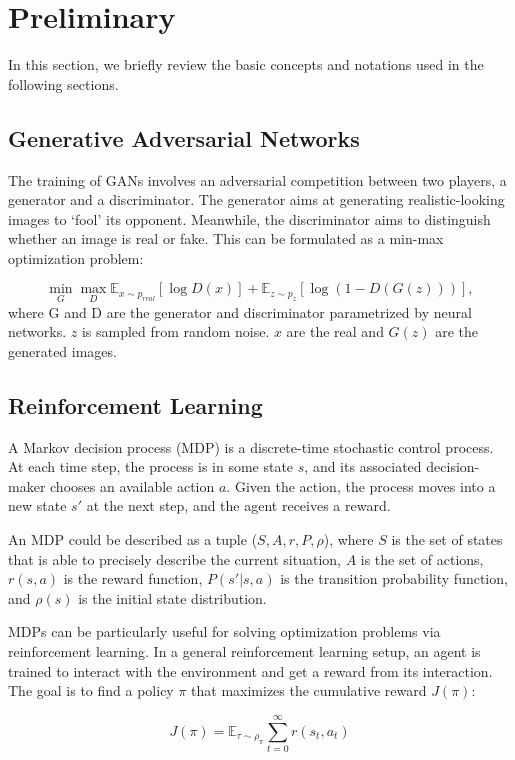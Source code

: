 \documentclass[runningheads]{llncs}
\begin{document}
\section{Preliminary}
In this section, we briefly review the basic concepts and notations used in the following sections.


\subsection{Generative Adversarial Networks}
The training of GANs involves an adversarial competition between two players, a generator and a discriminator. The generator aims at generating realistic-looking images to `fool' its opponent. Meanwhile, the discriminator aims to distinguish whether an image is real or fake. This can be formulated as a min-max optimization problem:

\begin{equation}
\min_G\max_D \mathbb{E}_{x\sim p_{real}}[\log{D(x)}]  + \mathbb{E}_{z\sim p_{z}} [\log{(1-D(G(z)))}],
\end{equation}
where G and D are the generator and discriminator parametrized by neural networks. $z$ is sampled from random noise. $x$ are the real and $G(z)$  are the generated images. 

\subsection{Reinforcement Learning}
A Markov decision process (MDP) is a discrete-time stochastic control process. At each time step, the process is in some state $s$, and its associated decision-maker chooses an available action $a$. Given the action, the process moves into a new state $s'$ at the next step, and the agent receives a reward. 

An MDP could be described as a tuple 
($S,A,r,P,\rho$), where $S$ is the set of states that is able to precisely describe the current situation,
$A$ is the set of actions, $r (s,a)$ is the reward function, 
$P (s'|s,a)$ is the 
transition probability function, and 
$\rho (s)$ is the initial state 
distribution.

MDPs can be particularly useful for solving optimization problems via reinforcement learning. In a general reinforcement learning setup, an agent is trained to interact with the environment and get a reward from its interaction. The goal is to find a policy $\pi$ that maximizes the cumulative reward $J(\pi)$:

\begin{equation}
    J(\pi) = \mathbb{E}_{\tau \sim \rho_{\pi}}{\sum_{t=0}^{\infty} r(s_t, a_t)}
\label{eq:j}
\end{equation}
\end{document}
